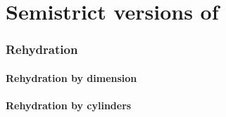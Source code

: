 \documentclass{cam-thesis}
\begin{document}
\chapter{Semistrict versions of \Catt}
\label{cha:cattsu}

\subsection{\Cattsu}
\label{sec:cattsu}

\subsection{\Cattsua}
\label{sec:cattsua}

\subsection{Rehydration}
\label{sec:rehydration}




\subsubsection{Rehydration by dimension}
\label{sec:rehydr-dimens}

\subsubsection{Rehydration by cylinders}
\label{sec:rehydr-cylind}



















\printbibliography
\end{document}
